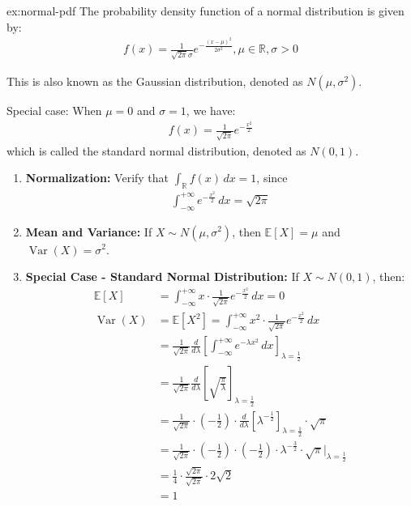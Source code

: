     \begin{example}{ex:normal-pdf}
    The probability density function of a normal distribution is given by:
    \begin{align*}
    f(x) = \frac{1}{\sqrt{2\pi}\sigma} e^{-\frac{(x-\mu)^2}{2\sigma^2}}, \mu \in \mathbb{R}, \sigma > 0
    \end{align*}
    
    This is also known as the Gaussian distribution, denoted as $N(\mu, \sigma^2)$.
    
    Special case: When $\mu = 0$ and $\sigma = 1$, we have:
    \begin{align*}
    f(x) = \frac{1}{\sqrt{2\pi}} e^{-\frac{x^2}{2}}
    \end{align*}
    which is called the standard normal distribution, denoted as $N(0,1)$.
    \end{example}
    \begin{proposition}{}
        \begin{enumerate}
        \item \textbf{Normalization:} Verify that $\int_{\mathbb{R}} f(x) \, dx = 1$, since 
        \begin{align*}
        \int_{-\infty}^{+\infty} e^{-\frac{x^2}{2}} \, dx = \sqrt{2\pi}
        \end{align*}
        
        \item \textbf{Mean and Variance:} If $X \sim N(\mu, \sigma^2)$, then $\mathbb{E}[X] = \mu$ and $\operatorname{Var}(X) = \sigma^2$.
        
        \item \textbf{Special Case - Standard Normal Distribution:} If $X \sim N(0,1)$, then:
        \begin{align*}
        \mathbb{E}[X] &= \int_{-\infty}^{+\infty} x \cdot \frac{1}{\sqrt{2\pi}} e^{-\frac{x^2}{2}} \, dx = 0 \\
        \operatorname{Var}(X) &= \mathbb{E}[X^2] = \int_{-\infty}^{+\infty} x^2 \cdot \frac{1}{\sqrt{2\pi}} e^{-\frac{x^2}{2}} \, dx \\
        &= \frac{1}{\sqrt{2\pi}} \frac{d}{d\lambda} \left[ \int_{-\infty}^{+\infty} e^{-\lambda x^2} \, dx \right]_{\lambda=\frac{1}{2}} \\
        &= \frac{1}{\sqrt{2\pi}} \frac{d}{d\lambda} \left[ \sqrt{\frac{\pi}{\lambda}} \right]_{\lambda=\frac{1}{2}} \\
        &= \frac{1}{\sqrt{2\pi}} \cdot \left( -\frac{1}{2} \right) \cdot \frac{d}{d\lambda} \left[ \lambda^{-\frac{1}{2}} \right]_{\lambda=\frac{1}{2}} \cdot \sqrt{\pi} \\
        &= \frac{1}{\sqrt{2\pi}} \cdot \left( -\frac{1}{2} \right) \cdot \left( -\frac{1}{2} \right) \cdot \lambda^{-\frac{3}{2}} \cdot \sqrt{\pi} \Big|_{\lambda=\frac{1}{2}} \\
        &= \frac{1}{4} \cdot \frac{\sqrt{2\pi}}{\sqrt{2\pi}} \cdot 2\sqrt{2} \\
        &= 1
        \end{align*}
        \end{enumerate}
        \end{proposition}
